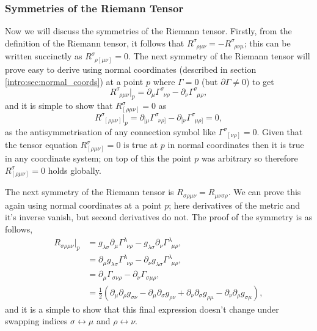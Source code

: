 \subsubsection{Symmetries of the Riemann Tensor}
Now we will discuss the symmetries of the Riemann tensor. Firstly, from the definition of the Riemann tensor, it follows that $R^\sigma_{\,\,\,\rho \mu\nu} = -R^\sigma_{\,\,\,\rho\nu\mu}$; this can be written succinctly as $R^\sigma_{\,\,\,\rho[\mu\nu]}=0$. The next symmetry of the Riemann tensor will prove easy to derive using normal coordinates (described in section \ref{intro:sec:normal_coords}) at a point $p$ where $\Gamma=0$ (but $\partial \Gamma\neq 0$) to get
\begin{equation}
R^\sigma_{\,\,\,\rho\mu\nu}\big|_{p} = \partial_\mu \Gamma^\sigma_{\,\,\,\nu\rho}  - \partial_\nu \Gamma^\sigma_{\,\,\,\mu\rho},
\end{equation}
and it is simple to show that $R^\sigma_{[\rho\mu\nu]}=0$ as
\begin{equation}
R^\sigma_{\,\,\,[\rho\mu\nu]}\big|_{p} = \partial_{[\mu} \Gamma^\sigma_{\,\,\,\nu\rho]}  - \partial_{[\nu} \Gamma^\sigma_{\,\,\,\mu\rho]}=0,
\end{equation}
as the antisymmetrisation of any connection symbol like $\Gamma^\sigma_{\,\,\,[\nu\rho]}=0$. Given that the tensor equation $R^\sigma_{[\rho\mu\nu]}=0$ is true at $p$ in normal coordinates then it is true in any coordinate system; on top of this the point $p$ was arbitrary so therefore $R^\sigma_{[\rho\mu\nu]}=0$ holds globally.

The next symmetry of the Riemann tensor is $R_{\sigma\rho\mu\nu} = R_{\mu\nu\sigma\rho}$. We can prove this again using normal coordinates at a point $p$; here derivatives of the metric and it's inverse vanish, but second derivatives do not. The proof of the symmetry is as follows,
\begin{align}
R_{\sigma\rho\mu\nu}\big|_p &= g_{\lambda\sigma}\partial_\mu \Gamma^\lambda_{\,\,\,\nu\rho}  - g_{\lambda\sigma}\partial_\nu \Gamma^\lambda_{\,\,\,\mu\rho} , \\
&= \partial_\mu g_{\lambda\sigma} \Gamma^\lambda_{\,\,\,\nu\rho}  - \partial_\nu g_{\lambda\sigma} \Gamma^\lambda_{\,\,\,\mu\rho} , \\
&= \partial_\mu \Gamma_{\sigma\nu\rho}  - \partial_\nu  \Gamma_{\sigma\mu\rho} , \\
&= \frac{1}{2}\left(\partial_{\mu} \partial_\rho g_{\sigma\nu} - \partial_{\mu} \partial_\sigma g_{\rho\nu} + \partial_{\nu} \partial_\sigma g_{\rho\mu} - \partial_{\nu} \partial_\rho g_{\sigma\mu}\right),
\end{align}
and it is a simple to show that this final expression doesn't change under swapping indices $\sigma\leftrightarrow\mu$ and $\rho\leftrightarrow\nu$.

